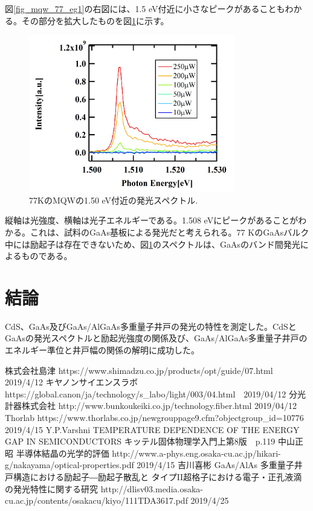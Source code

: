\documentclass[11pt,a4j]{jsarticle}
\begin{document}
\begin{enumerate}
       図\ref{fig_mqw_77_eg1}の右図には、1.5 eV付近に小さなピークがあることもわかる。その部分を拡大したものを図\ref{fig_mqw_77_1.5ev1}に示す。

       \begin{figure}[ht]
        \centering
        \includegraphics[clip,width=9cm]{start2_MQW_77K_GaAs.jpg}
        \caption{77KのMQWの1.50 eV付近の発光スペクトル.}
        \label{fig_mqw_77_1.5ev1}
       \end{figure}

       縦軸は光強度、横軸は光子エネルギーである。1.508 eVにピークがあることがわかる。これは、試料のGaAs基板による発光だと考えられる。77 KのGaAsバルク中には励起子は存在できないため、図\ref{fig_mqw_77_1.5ev1}のスペクトルは、GaAsのバンド間発光によるものである。

\end{enumerate}%

\newpage
\section{結論}
CdS、GaAs及びGaAs/AlGaAs多重量子井戸の発光の特性を測定した。CdSとGaAsの発光スペクトルと励起光強度の関係及び、GaAs/AlGaAs多重量子井戸のエネルギー準位と井戸幅の関係の解明に成功した。

\begin{thebibliography}{9}
 株式会社島津 https://www.shimadzu.co.jp/products/opt/guide/07.html 2019/4/12
  キヤノンサイエンスラボ https://global.canon/ja/technology/s\_labo/light/003/04.html　2019/04/12
  分光計器株式会社 http://www.bunkoukeiki.co.jp/technology.fiber.html 2019/04/12
 Thorlab\,\,https://www.thorlabs.co.jp/newgrouppage9.cfm?objectgroup\_id=10776 2019/4/15
 Y.P.Varshni TEMPERATURE DEPENDENCE OF THE ENERGY GAP IN SEMICONDUCTORS
 キッテル固体物理学入門上第8版　p.119
 中山正昭 半導体結晶の光学的評価 http://www.a-phys.eng.osaka-cu.ac.jp/hikari-g/nakayama/optical-properties.pdf 2019/4/15
 吉川喜彬 GaAs/AlAs 多重量子井戸構造における励起子―励起子散乱と
 タイプII超格子における電子・正孔液滴の発光特性に関する研究 http://dlisv03.media.osaka-cu.ac.jp/contents/osakacu/kiyo/111TDA3617.pdf 2019/4/25

\end{thebibliography}
\end{document}
